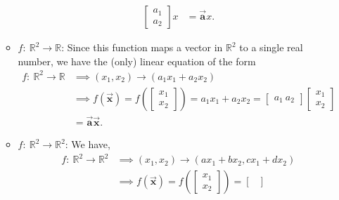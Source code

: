 \documentclass{report}
\begin{document}
\begin{itemize}
\begin{itemize}
\begin{align*}
\begin{bmatrix}
                                                                  a_{1} \\ a_{2}
                                                              \end{bmatrix} x 
                                                              &=\vec{\mathbf{a}}x
                          .\end{align*}
                      \item $f:\ \mathbb{R}^{2} \to \mathbb{R}$: Since this function maps a vector in $\mathbb{R}^{2}$ to a single real number, we have the (only) linear equation of the form
                          \begin{align*}
                              f:\ \mathbb{R}^{2} \to \mathbb{R} &\implies (x_{1}, x_{2}) \to (a_{1}x_{1} + a_{2}x_{2}) \\
                                                                &\implies f(\vec{\mathbf{x}}) = f\left( \begin{bmatrix}
                                      x_{1} \\ x_{2}
                                  \end{bmatrix}\right) = a_{1}x_{1} + a_{2}x_{2} = \begin{bmatrix}
                                  a_{1}\ a_{2}
                              \end{bmatrix}
                              \begin{bmatrix}
                                  x_{1} \\ x_{2}
                              \end{bmatrix} \\
                                                                &=\vec{\mathbf{a}}\vec{\mathbf{x}}
                          .\end{align*}
                      \item $f:\ \mathbb{R}^{2} \to \mathbb{R}^{2}$: We have,
                          \begin{align*}
                              f:\ \mathbb{R}^{2} \to \mathbb{R}^{2} &\implies (x_{1}, x_{2}) \to (ax_{1}+ bx_{2}, cx_{1} + dx_{2}) \\
                                                                    &\implies f(\vec{\mathbf{x}}) = f\left( \begin{bmatrix}
                                                                        x_{1} \\ x_{2}
                                                                    \end{bmatrix}\right) = \begin{bmatrix}

\end{bmatrix}
\end{align*}
\end{itemize}
\end{itemize}
\end{document}
